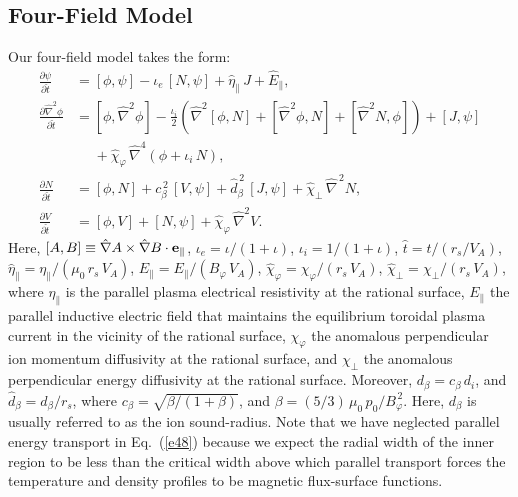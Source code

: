 \documentclass[12pt,prb,aps]{revtex4-1}
\begin{document}
\subsection{Four-Field Model}
Our four-field model takes the form:\cite{fw,err2,err3}
\begin{align}
\frac{\partial\psi}{\partial\hat{t}}&= [\phi,\psi] -\iota_e\,[N,\psi]
+\hat{\eta}_\parallel\,J + \hat{E}_\parallel,\label{e16a}\\[0.5ex]
\frac{\partial \hat{\nabla}^2\phi}{\partial \hat{t}}&= [\phi,\hat{\nabla}^2\phi] - \frac{\iota_i}{2}\left(\hat{\nabla}^2[\phi,N] + [\hat{\nabla}^2\phi,N] + [\hat{\nabla}^2 N,\phi]\right) + [J,\psi] \nonumber\\[0.5ex]&\phantom{=}+\hat{\chi}_\varphi  \,\hat{\nabla}^4\!\left(\phi + \iota_i\,N\right), \\[0.5ex]
\frac{\partial N}{\partial \hat{t}}&= [\phi,N] +c_\beta^{\,2}\,[V,\psi] +\hat{d}_\beta^{\,2}\,[J,\psi]
+ \hat{\chi}_\perp\,\hat{\nabla}^{\,2}N,\label{e48}\\[0.5ex]
\frac{\partial V}{\partial\hat{t}}&= [\phi,V] +[N,\psi] + \hat{\chi}_\varphi\,\hat{\nabla}^2 V.\label{e21}
\end{align}
Here, $[A,B]\equiv \hat{\nabla} A\times \hat{\nabla} B\cdot {\bf e}_\parallel$, $\iota_e=\iota/(1+\iota)$, $\iota_i=1/(1+\iota)$, $\hat{t} = t/(r_s/V_A)$, $\hat{\eta}_{\parallel} = \eta_{\parallel}/(\mu_0\,r_s\,V_A)$, $\hat{E}_\parallel = E_\parallel/(B_\varphi\,V_A)$, 
$\hat{\chi}_\varphi= \chi_\varphi/(r_s\,V_A)$, $\hat{\chi}_\perp=\chi_\perp/(r_s\,V_A)$, where $\eta_{\parallel}$ is the parallel  plasma electrical
resistivity at the rational surface, $E_\parallel$ the parallel inductive electric field that maintains the equilibrium toroidal
plasma current in the vicinity of the rational surface,  $\chi_\varphi$  the anomalous perpendicular ion momentum
diffusivity at the rational surface, and $\chi_\perp$ the anomalous perpendicular energy diffusivity at the rational surface.
Moreover, $d_\beta=c_\beta\,d_i$, and $\hat{d}_\beta=d_\beta/r_s$, where $c_\beta = \sqrt{\beta/(1+\beta)}$, and
$\beta=(5/3)\,\mu_0\,p_0/B_\varphi^{\,2}$. Here, $d_\beta$ is usually referred to as the ion sound-radius. 
Note that we have neglected parallel energy transport in Eq.~(\ref{e48}) because we expect the radial width of the inner region to be less than the critical width above which parallel transport forces the temperature and density profiles to be magnetic flux-surface functions.\cite{hel}
\end{document}
